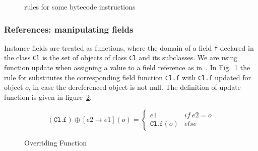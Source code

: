 \begin{figure}[ht]


\caption{rules for some bytecode instructions}
\label{instrWP}
\end{figure}

\subsubsection{References: manipulating fields}
Instance fields are treated as functions, where the domain of a field \texttt{f} 
declared in the class \texttt{Cl} is the set of objects of class \texttt{Cl} and its subclasses.
We are using function update when assigning a value to a field reference as in~\cite{B00ppp}. 
In Fig.~\ref{instrWP} the rule for  substitutes the corresponding field function \texttt{Cl.f} with \texttt{Cl.f} updated for object $o$, in case the dereferenced object is not null. The definition of update function is given in figure~\ref{override}.

\begin{figure}
$$
 (\texttt{Cl.f})\oplus[e2 \rightarrow e1](o) = \left\{ \begin{array} {ll}
						       e1 & if \ e2 = o \\
					               \texttt{Cl.f}(o)	& else 
	\end{array}\right. 
$$ 
\caption{Overriding Function}
\label{override}
\end{figure}

